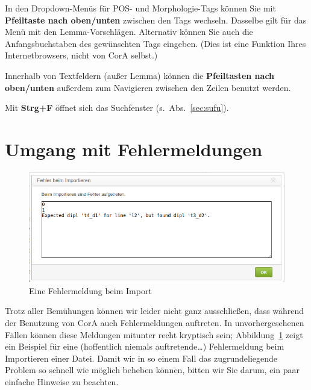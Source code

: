 \documentclass[11pt,a4paper,parskip=half]{scrartcl}
\begin{document}
In den Dropdown-Menüs für POS- und Morphologie-Tags können Sie mit
\textbf{Pfeiltaste nach oben/unten} zwischen den Tags wechseln.
Dasselbe gilt für das Menü mit den Lemma-Vorschlägen.  Alternativ
können Sie auch die Anfangsbuchstaben des gewünschten Tags eingeben.
(Dies ist eine Funktion Ihres Internetbrowsers, nicht von CorA
selbst.)

Innerhalb von Textfeldern (außer Lemma) können die \textbf{Pfeiltasten nach
  oben/unten} außerdem zum Navigieren zwischen den Zeilen benutzt werden.

Mit \textbf{Strg+F} öffnet sich das Suchfenster (s.\ Abs.\ \ref{sec:sufu}).

\newpage
\section{Umgang mit Fehlermeldungen}
\label{sec:error}

\begin{figure}
  \centering
  \includegraphics[width=0.8\linewidth]{img/import-error.png}
  \caption{Eine Fehlermeldung beim Import}
  \label{fig:import-error}
\end{figure}

Trotz aller Bemühungen können wir leider nicht ganz ausschließen, dass
während der Benutzung von CorA auch Fehlermeldungen auftreten.  In
unvorhergesehenen Fällen können diese Meldungen mitunter recht
kryptisch sein; Abbildung~\ref{fig:import-error} zeigt ein Beispiel
für eine (hoffentlich niemals auftretende\ldots) Fehlermeldung beim
Importieren einer Datei.  Damit wir in so einem Fall das
zugrundeliegende Problem so schnell wie möglich beheben können, bitten
wir Sie darum, ein paar einfache Hinweise zu beachten.
\end{document}
